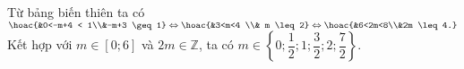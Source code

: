 \begin{ex}
{        \begin{center}
        \end{center}
        Từ bảng biến thiên ta có $\hoac{&0<-m+4 < 1\\&-m+3 \geq 1} \Leftrightarrow \hoac{&3<m<4 \\& m \leq 2}\Leftrightarrow \hoac{&6<2m<8\\&2m \leq 4.}$ \\
        Kết hợp với $m\in[0;6]$ và $2m\in\mathbb{Z}$, ta có $m \in\left\{0; \dfrac{1}{2}; 1; \dfrac{3}{2}; 2; \dfrac{7}{2}\right\}$.
    }
\end{ex}
